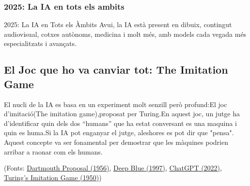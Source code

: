 \subsubsection{2025: La IA en tots els ambits}
    2025: La IA en Tots els Àmbits
    Avui, la IA està present en dibuix, contingut audiovisual, cotxes autònoms, medicina i molt més, amb models cada vegada més especialitzats i avançats.
\subsection{El Joc que ho va canviar tot: The Imitation Game}
El nucli de la IA es basa en un experiment molt senzill però profund:El joc d'imitació(The imitation game),proposat per Turing.En aquest joc, un jutge ha d’identificar quin dels dos ``humans'' que ha estat conversant es una maquina  i quin es huma.Si la IA pot enganyar el jutge, aleshores es pot dir que "pensa". Aquest concepte va ser fonamental per demostrar que les màquines podrien arribar a raonar com els humans.



(Fonts: \href{https://raysolomonoff.com/dartmouth/boxa/dart564props.pdf}{Dartmouth Proposal (1956)}, \href{https://www.ibm.com/history/deep-blue}{Deep Blue (1997)}, \href{https://openai.com/index/chatgpt/}{ChatGPT (2022)}, \href{https://academic.oup.com/mind/article-abstract/LIX/236/433/986238?redirectedF}{Turing's Imitation Game (1950)})
